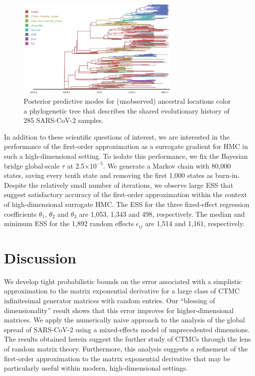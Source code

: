 \documentclass[9pt,twocolumn,twoside]{pnas-new}
\newcommand{\?}{\textbf{?}}
\begin{document}
\begin{figure}[!t]
	\centering
	\includegraphics[width=0.7\textwidth]{summary2.tree.pdf}
	\vspace{-0.5em}
	\caption{Posterior predictive modes for (unobserved) ancestral
          locations color a phylogenetic tree that describes the
          shared evolutionary history of 285 SARS-CoV-2
          samples.}\label{fig:tree}
\end{figure}

In addition to these scientific questions of interest, we are
interested in the performance of the first-order approximation as a
surrogate gradient for HMC in such a high-dimensional setting. To
isolate this performance, we fix the Bayesian bridge global-scale
$\tau$ at 2.5$\times10^{-5}$.  We generate a Markov chain with 80,000
states, saving every tenth state and removing the first 1,000 states as
burn-in.  Despite the relatively small number of iterations, we
observe large ESS that suggest satisfactory accuracy of the
first-order approximation within the context of high-dimensional
surrogate HMC.  The ESS for the three fixed-effect regression
coefficients $\theta_1$, $\theta_2$ and $\theta_3$ are 1,053, 1,343
and 498, respectively.  The median and minimum ESS for the 1,892
random effects $\epsilon_{ij}$ are 1,514 and 1,161, respectively.


\section*{Discussion}

We develop tight probabilistic bounds on the error associated
with a simplistic approximation to the matrix exponential derivative
for a large class of CTMC infinitesimal generator matrices with random
entries.  Our ``blessing of dimensionality'' result shows that this
error improves for higher-dimensional matrices.  We apply the
numerically naive approach to the analysis of the global spread of
SARS-CoV-2 using a mixed-effects model of unprecedented dimensions.
The results obtained herein suggest the further study of CTMCs through
the lens of random matrix theory.  Furthermore, this analysis suggests a refinement of the first-order
approximation to the matrix exponential derivative that may be particularly useful within
modern, high-dimensional settings.
\end{document}
